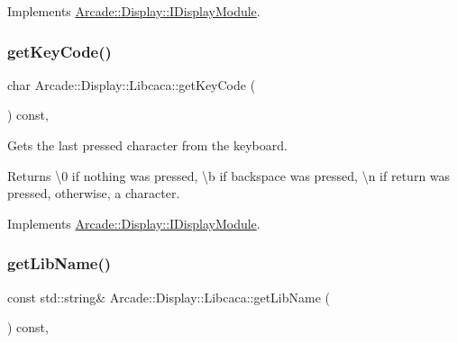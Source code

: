 Implements \mbox{\hyperlink{classArcade_1_1Display_1_1IDisplayModule_aab078d82e6fdd32682553947c20226ac}{Arcade\+::\+Display\+::\+I\+Display\+Module}}.

\mbox{\label{classArcade_1_1Display_1_1Libcaca_a741fdec5c2e77cc7959e5f3444f8c8ac}} 
\subsubsection{\texorpdfstring{getKeyCode()}{getKeyCode()}}
{\footnotesize\ttfamily char Arcade\+::\+Display\+::\+Libcaca\+::get\+Key\+Code (\begin{DoxyParamCaption}{ }\end{DoxyParamCaption}) const\hspace{0.3cm}{\ttfamily [final]}, {\ttfamily [virtual]}}



Gets the last pressed character from the keyboard. 

\begin{DoxyReturn}{Returns}
\textbackslash{}0 if nothing was pressed, \textbackslash{}b if backspace was pressed, \textbackslash{}n if return was pressed, otherwise, a character. 
\end{DoxyReturn}


Implements \mbox{\hyperlink{classArcade_1_1Display_1_1IDisplayModule_a403f8a0f065dad707a881ef3cee79805}{Arcade\+::\+Display\+::\+I\+Display\+Module}}.

\mbox{\label{classArcade_1_1Display_1_1Libcaca_a26e6dd02a853963fdcb812bddb3dee1e}} 
\subsubsection{\texorpdfstring{getLibName()}{getLibName()}}
{\footnotesize\ttfamily const std\+::string\& Arcade\+::\+Display\+::\+Libcaca\+::get\+Lib\+Name (\begin{DoxyParamCaption}{ }\end{DoxyParamCaption}) const\hspace{0.3cm}{\ttfamily [final]}, {\ttfamily [virtual]}}



